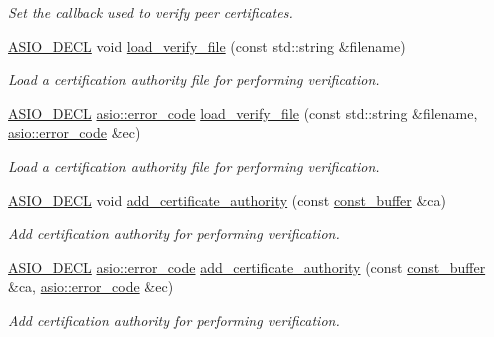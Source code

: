 \begin{DoxyCompactItemize}
\begin{DoxyCompactList}\small\item\em Set the callback used to verify peer certificates. \end{DoxyCompactList}\item 
\hyperlink{config_8hpp_ab54d01ea04afeb9a8b39cfac467656b7}{A\+S\+I\+O\+\_\+\+D\+E\+C\+L} void \hyperlink{classasio_1_1ssl_1_1context_ac2b54541187b52ce4c1d71c421dea2ff}{load\+\_\+verify\+\_\+file} (const std\+::string \&filename)
\begin{DoxyCompactList}\small\item\em Load a certification authority file for performing verification. \end{DoxyCompactList}\item 
\hyperlink{config_8hpp_ab54d01ea04afeb9a8b39cfac467656b7}{A\+S\+I\+O\+\_\+\+D\+E\+C\+L} \hyperlink{classasio_1_1error__code}{asio\+::error\+\_\+code} \hyperlink{classasio_1_1ssl_1_1context_a27cb33d0d8081c9b7816d96281902b57}{load\+\_\+verify\+\_\+file} (const std\+::string \&filename, \hyperlink{classasio_1_1error__code}{asio\+::error\+\_\+code} \&ec)
\begin{DoxyCompactList}\small\item\em Load a certification authority file for performing verification. \end{DoxyCompactList}\item 
\hyperlink{config_8hpp_ab54d01ea04afeb9a8b39cfac467656b7}{A\+S\+I\+O\+\_\+\+D\+E\+C\+L} void \hyperlink{classasio_1_1ssl_1_1context_aa66f18d9dfd397c143ef4795e74b8772}{add\+\_\+certificate\+\_\+authority} (const \hyperlink{classasio_1_1const__buffer}{const\+\_\+buffer} \&ca)
\begin{DoxyCompactList}\small\item\em Add certification authority for performing verification. \end{DoxyCompactList}\item 
\hyperlink{config_8hpp_ab54d01ea04afeb9a8b39cfac467656b7}{A\+S\+I\+O\+\_\+\+D\+E\+C\+L} \hyperlink{classasio_1_1error__code}{asio\+::error\+\_\+code} \hyperlink{classasio_1_1ssl_1_1context_a62c69c8e89453a2ec06aff2c036a9294}{add\+\_\+certificate\+\_\+authority} (const \hyperlink{classasio_1_1const__buffer}{const\+\_\+buffer} \&ca, \hyperlink{classasio_1_1error__code}{asio\+::error\+\_\+code} \&ec)
\begin{DoxyCompactList}\small\item\em Add certification authority for performing verification. \end{DoxyCompactList}\item 

\end{DoxyCompactItemize}
